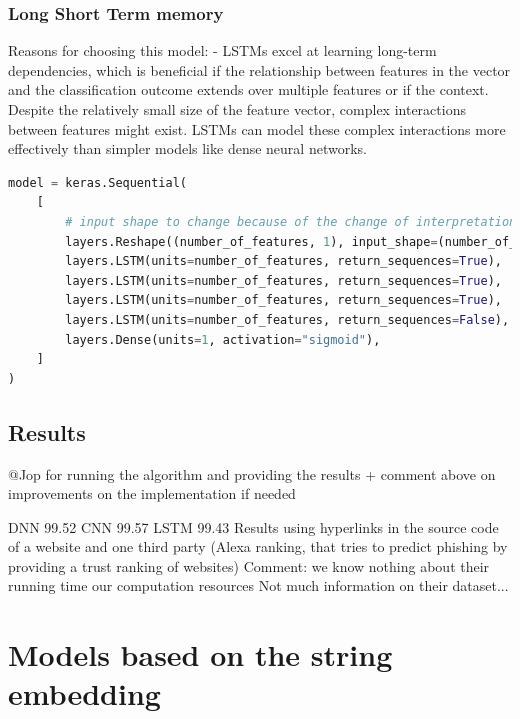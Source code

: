 \documentclass{article}
\begin{document}
    \subsubsection{Long Short Term memory}
    Reasons for choosing this model:
    - LSTMs excel at learning long-term dependencies, which is beneficial if the relationship between features in the vector and the classification outcome extends over multiple features or if the context.
    Despite the relatively small size of the feature vector, complex interactions between features might exist.
    LSTMs can model these complex interactions more effectively than simpler models like dense neural networks.


    \begin{lstlisting}[language=Python, caption=LSTM on feature vector architecture]
model = keras.Sequential(
    [
        # input shape to change because of the change of interpretation of the features
        layers.Reshape((number_of_features, 1), input_shape=(number_of_features,)),
        layers.LSTM(units=number_of_features, return_sequences=True),
        layers.LSTM(units=number_of_features, return_sequences=True),
        layers.LSTM(units=number_of_features, return_sequences=True),
        layers.LSTM(units=number_of_features, return_sequences=False),
        layers.Dense(units=1, activation="sigmoid"),
    ]
)
    \end{lstlisting}

    \subsection{Results}\label{subsec:results2}
    @Jop for running the algorithm and providing the results + comment above on improvements on the implementation if needed

    \cite{EfficientDeepLearningPhishingDetection} DNN 99.52
    \cite{EfficientDeepLearningPhishingDetection} CNN 99.57
    \cite{EfficientDeepLearningPhishingDetection} LSTM 99.43
    Results using hyperlinks in the source code of a website and one third party (Alexa ranking, that tries to predict phishing by providing a trust ranking of websites)
    Comment: we know nothing about their running time our computation resources
    Not much information on their dataset...


    \section{Models based on the string embedding}\label{sec:models-based-on-the-string-embedding}
\end{document}
